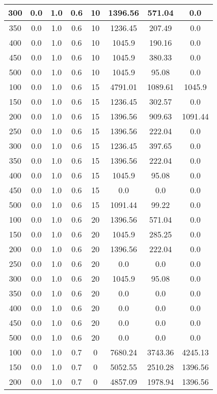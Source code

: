 \documentclass[a4paper, 12pt]{extreport}
\begin{document}
\begin{itemize}
\begin{longtable}{|c|c|c|c|c|c|c|c|}
			300 & 0.0 & 1.0 & 0.6 & 10 & 1396.56 & 571.04 & 0.0 \\\hline
			350 & 0.0 & 1.0 & 0.6 & 10 & 1236.45 & 207.49 & 0.0 \\\hline
			400 & 0.0 & 1.0 & 0.6 & 10 & 1045.9 & 190.16 & 0.0 \\\hline
			450 & 0.0 & 1.0 & 0.6 & 10 & 1045.9 & 380.33 & 0.0 \\\hline
			500 & 0.0 & 1.0 & 0.6 & 10 & 1045.9 & 95.08 & 0.0 \\\hline
			100 & 0.0 & 1.0 & 0.6 & 15 & 4791.01 & 1089.61 & 1045.9 \\\hline
			150 & 0.0 & 1.0 & 0.6 & 15 & 1236.45 & 302.57 & 0.0 \\\hline
			200 & 0.0 & 1.0 & 0.6 & 15 & 1396.56 & 909.63 & 1091.44 \\\hline
			250 & 0.0 & 1.0 & 0.6 & 15 & 1396.56 & 222.04 & 0.0 \\\hline
			300 & 0.0 & 1.0 & 0.6 & 15 & 1236.45 & 397.65 & 0.0 \\\hline
			350 & 0.0 & 1.0 & 0.6 & 15 & 1396.56 & 222.04 & 0.0 \\\hline
			400 & 0.0 & 1.0 & 0.6 & 15 & 1045.9 & 95.08 & 0.0 \\\hline
			450 & 0.0 & 1.0 & 0.6 & 15 & 0.0 & 0.0 & 0.0 \\\hline
			500 & 0.0 & 1.0 & 0.6 & 15 & 1091.44 & 99.22 & 0.0 \\\hline
			100 & 0.0 & 1.0 & 0.6 & 20 & 1396.56 & 571.04 & 0.0 \\\hline
			150 & 0.0 & 1.0 & 0.6 & 20 & 1045.9 & 285.25 & 0.0 \\\hline
			200 & 0.0 & 1.0 & 0.6 & 20 & 1396.56 & 222.04 & 0.0 \\\hline
			250 & 0.0 & 1.0 & 0.6 & 20 & 0.0 & 0.0 & 0.0 \\\hline
			300 & 0.0 & 1.0 & 0.6 & 20 & 1045.9 & 95.08 & 0.0 \\\hline
			350 & 0.0 & 1.0 & 0.6 & 20 & 0.0 & 0.0 & 0.0 \\\hline
			400 & 0.0 & 1.0 & 0.6 & 20 & 0.0 & 0.0 & 0.0 \\\hline
			450 & 0.0 & 1.0 & 0.6 & 20 & 0.0 & 0.0 & 0.0 \\\hline
			500 & 0.0 & 1.0 & 0.6 & 20 & 0.0 & 0.0 & 0.0 \\\hline
			100 & 0.0 & 1.0 & 0.7 & 0 & 7680.24 & 3743.36 & 4245.13 \\\hline
			150 & 0.0 & 1.0 & 0.7 & 0 & 5052.55 & 2510.28 & 1396.56 \\\hline
			200 & 0.0 & 1.0 & 0.7 & 0 & 4857.09 & 1978.94 & 1396.56 \\\hline

\end{longtable}
\end{itemize}
\end{document}
